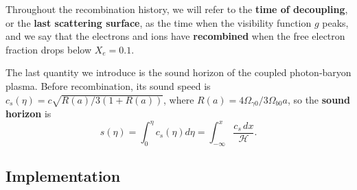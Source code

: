 \documentclass[10pt,a4paper]{article}
\begin{document}
Throughout the recombination history, we will refer to
the \textbf{time of decoupling}, or the \textbf{last scattering surface}, as the time when the visibility function $g$ peaks,
and we say that the electrons and ions have \textbf{recombined} when the free electron fraction drops below $X_e = 0.1$.

The last quantity we introduce is the sound horizon
of the coupled photon-baryon plasma.
Before recombination, its sound speed is
$c_s(\eta) = c \sqrt{R(a) / 3(1+R(a))}$,
where $R(a) = 4 \Omega_{\gamma 0} / 3 \Omega_{b 0} a$,
so the \textbf{sound horizon} is
\begin{equation}
	s(\eta) = \int_0^\eta c_s(\eta) d\eta = \int_{-\infty}^x \frac{c_s \, dx}{\mathcal{H}}.
\label{eq_sound_horizon}
\end{equation}

\subsection{Implementation}
\end{document}
